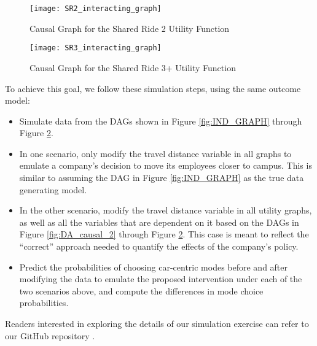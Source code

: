 \begin{figure}
   \centering
   \texttt{[image: SR2\_interacting\_graph]}
   \caption{Causal Graph for the Shared Ride 2 Utility Function}
   \label{fig:SR2_causal_2}
\end{figure}

\begin{figure}
   \centering
   \texttt{[image: SR3\_interacting\_graph]}
   \caption{Causal Graph for the Shared Ride 3+ Utility Function}
   \label{fig:SR3_causal_2}
\end{figure}

To achieve this goal, we follow these simulation steps, using the same outcome model:
\begin{itemize}
   \item Simulate data from the DAGs shown in Figure \ref{fig:IND_GRAPH} through Figure \ref{fig:SR3_causal_2}.
   \item In one scenario, only modify the travel distance variable in all graphs to emulate a company's decision to move its employees closer to campus. This is similar to assuming the DAG in Figure \ref{fig:IND_GRAPH} as the true data generating model.
   \item In the other scenario, modify the travel distance variable in all utility graphs, as well as all the variables that are dependent on it based on the DAGs in Figure \ref{fig:DA_causal_2} through Figure \ref{fig:SR3_causal_2}. This case is meant to reflect the ``correct'' approach needed to quantify the effects of the company's policy. 
   \item Predict the probabilities of choosing car-centric modes before and after modifying the data to emulate the proposed intervention under each of the two scenarios above, and compute the differences in mode choice probabilities.
\end{itemize}

Readers interested in exploring the details of our simulation exercise can refer to our GitHub repository \citep{brathwaite_etal_2020}.


